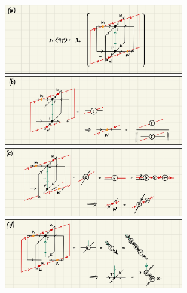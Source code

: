 \begin{figure}
	\centering
	\subcaptionbox{\label{fig:YB_move_iterate_polar_overlap}}
	{%
		\includegraphics[width=0.7\textwidth]{figures/disoTPS/YB_move_iterate_polar_a.jpeg}
	}
	\subcaptionbox{\label{fig:YB_move_iterate_polar_optimize_W2}}
	{%
		\includegraphics[width=0.7\textwidth]{figures/disoTPS/YB_move_iterate_polar_b.jpeg}
	}
	\subcaptionbox{\label{fig:YB_move_iterate_polar_optimize_W1}}
	{%
		\includegraphics[width=0.7\textwidth]{figures/disoTPS/YB_move_iterate_polar_c.jpeg}
	}
	\subcaptionbox{\label{fig:YB_move_iterate_polar_optimize_T}}
	{%
		\includegraphics[width=0.7\textwidth]{figures/disoTPS/YB_move_iterate_polar_d.jpeg}
	}
	\caption{}
	\label{fig:YB_move_iterate_polar}
\end{figure}
